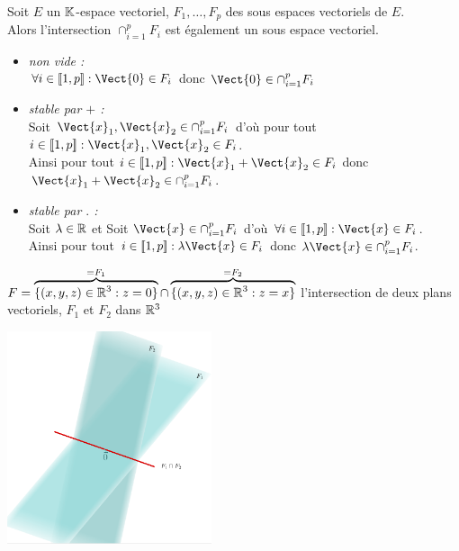 \documentclass{book}
\begin{document}
\begin{Proposition}
Soit $E$ un $\mathbb{K} $-espace vectoriel, $F_1, \dots, F_p$ des sous espaces vectoriels de $E$.\\
Alors l'intersection $\cap_{i=1}^p F_i$ est également un sous espace vectoriel.
\end{Proposition}
\begin{Demonstration}
\begin{itemize}
\item \textit{non vide :}\\
$\forall i \in \Intf{1}{p}: \Vect{0}\in F_i$ donc $\Vect{0}\in \cap_{i=1}^p F_i$
\item \textit{stable par $+$ :}\\
Soit $\Vect{x}_1,\Vect{x}_2 \in \cap_{i=1}^p F_i $ d'où pour tout $i\in \Intf{1}{p}: \Vect{x}_1,\Vect{x}_2\in F_i$.\\
Ainsi pour tout $i \in \Intf{1}{p}: \Vect{x}_1+\Vect{x}_2 \in F_i$ donc $\Vect{x}_1+\Vect{x}_2\in \cap_{i=1}^p F_i$.
\item
  \textit{stable par $.$ :} \\
Soit $\lambda\in \mathbb{R}$ et Soit $\Vect{x}\in \cap_{i=1}^p F_i $ d'où $\forall i \in \Intf{1}{p}: \Vect{x}\in F_i$.\\
Ainsi pour tout $i \in \Intf{1}{p}: \lambda\Vect{x}\in F_i$ donc $\lambda \Vect{x}\in \cap_{i=1}^p F_i$.
\end{itemize}
\end{Demonstration}
\begin{Exemple}$F=\overbrace{\{(x,y,z)\in \mathbb{R}^3: z=0\}}^{=F_1}\cap \overbrace{\{(x,y,z)\in \mathbb{R}^3: z=x\}}^{=F_2} $  l'intersection de deux plans vectoriels, $F_1$ et $F_2$ dans $\mathbb{R} ^3$
\begin{center}
\includegraphics[width=6cm]{espace_vectoriel_inter.png}
\end{center}
\end{Exemple}
\end{document}
